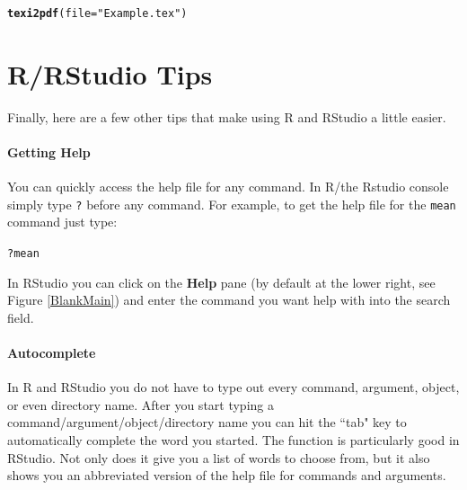 \documentclass[ChapterTOCs,krantz1]{krantz}\usepackage{graphicx, color}
\makeatletter
\newcommand{\hlfunctioncall}[1]{\textcolor[rgb]{0.501960784313725,0,0.329411764705882}{\textbf{#1}}}%
\newcommand{\hlstring}[1]{\textcolor[rgb]{0.6,0.6,1}{#1}}%
\newenvironment{kframe}{%
 \def\at@end@of@kframe{}%
 \ifinner\ifhmode%
  \def\at@end@of@kframe{\end{minipage}}%
  \begin{minipage}{\columnwidth}%
 \fi\fi%
 \def\FrameCommand##1{\hskip\@totalleftmargin \hskip-\fboxsep
 \colorbox{shadecolor}{##1}\hskip-\fboxsep
     \hskip-\linewidth \hskip-\@totalleftmargin \hskip\columnwidth}%
 \MakeFramed {\advance\hsize-\width
   \@totalleftmargin\z@ \linewidth\hsize
   \@setminipage}}%
 {\par\unskip\endMakeFramed%
 \at@end@of@kframe}
\newenvironment{knitrout}{}{} %
\makeatother
\begin{document}
\begin{knitrout}
\color{fgcolor}\begin{kframe}
\begin{alltt}
\hlfunctioncall{texi2pdf}(file = \hlstring{"Example.tex"})
\end{alltt}
\end{kframe}
\end{knitrout}

 
\section{R/RStudio Tips}

Finally, here are a few other tips that make using R and RStudio a little easier.

\paragraph{Getting Help}

You can quickly access the help file for any command. In R/the Rstudio console simply type {\tt{?}} before any command. For example, to get the help file for the {\tt{mean}} command just type:

\begin{knitrout}
\color{fgcolor}\begin{kframe}
\begin{alltt}
?mean
\end{alltt}
\end{kframe}
\end{knitrout}


\noindent In RStudio you can click on the {\bf{Help}} pane (by default at the lower right, see Figure \ref{BlankMain}) and enter the command you want help with into the search field.

\paragraph{Autocomplete}

In R and RStudio you do not have to type out every command, argument, object, or even directory name. After you start typing a command/argument/object/directory name you can hit the ``tab" key to automatically complete the word you started. The  function is particularly good in RStudio. Not only does it give you a list of words to choose from, but it also shows you an abbreviated version of the help file for commands and arguments.
\end{document}
